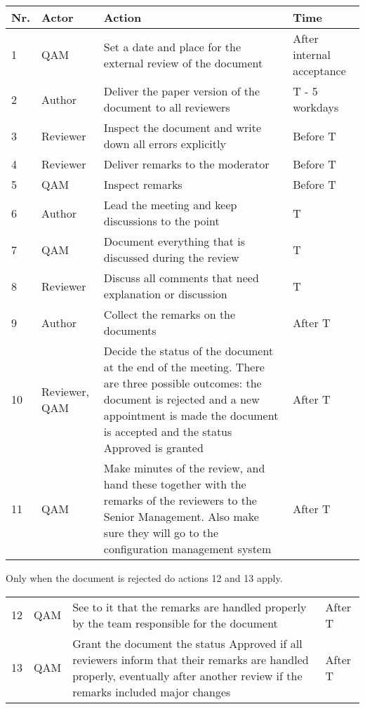 \begin{tabular}{|l|p{6em}|p{20em}|p{6em}|}
\hline
Nr. &Actor &     Action       &                                                Time\\
\hline
1  & QAM   &      Set a date and place for the external review of the document & After internal acceptance\\
2  & Author    & Deliver the paper version of the document to all reviewers  & T - 5 workdays\\
3  & Reviewer &Inspect the document and write down all errors explicitly     & Before T\\
4  & Reviewer &Deliver remarks to the moderator                              & Before T\\
5  & QAM      &  Inspect remarks                                             & Before T\\
6  & Author   &  Lead the meeting and keep discussions to the point          & T\\
7  & QAM      &  Document everything that is discussed during the review     & T\\
8  & Reviewer &Discuss all comments that need explanation or discussion     &  T\\
9  & Author   &  Collect the remarks on the documents                       &  After T\\
10 & Reviewer, QAM & Decide the status of the document at the end of the meeting. There are three possible outcomes: the document is rejected and a new appointment is made the document is accepted and the status Approved is granted  & After T\\
11 & QAM     &  Make minutes of the review, and hand these together with the remarks of the reviewers to the Senior Management. Also make sure they will go to the configuration management system  & After T\\
\hline               
\end{tabular}

Only when the document is rejected do actions 12 and 13 apply.\\

\begin{tabular}{|l|p{6em}|p{20em}|p{6em}|}    
\hline          
12 & QAM  &      See to it that the remarks are handled properly by the team responsible for the document & After T\\
               
13 & QAM  &      Grant the document the status Approved if all reviewers inform that their remarks are handled properly, eventually       after another review if the remarks included major changes & After T\\
\hline
\end{tabular}


